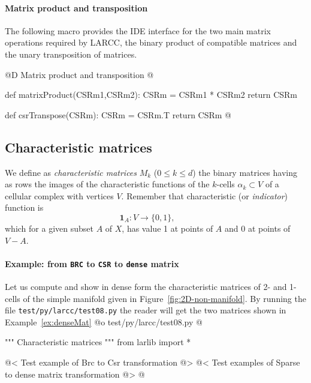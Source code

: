 \documentclass[11pt,oneside]{article}    %
\begin{document}
\paragraph{Matrix product and transposition}

The following macro provides the IDE interface for the two main matrix operations required by LARCC, the binary product of compatible matrices and the unary transposition of matrices.

@D Matrix product and transposition
@{def matrixProduct(CSRm1,CSRm2):
    CSRm = CSRm1 * CSRm2
    return CSRm

def csrTranspose(CSRm):
    CSRm = CSRm.T
    return CSRm
@}


\subsection{Characteristic matrices}

We define as \emph{characteristic matrices} $M_k$ ($0\leq k\leq d$) the binary matrices having as rows the images of the characteristic functions of the $k$-cells $\alpha_k\subset V$ of a cellular complex with vertices $V$.
Remember that characteristic (or \emph{indicator}) function is 
\[
\mathbf{1}_A\colon V \to \{0, 1\}, \qquad 
\]
which for a given subset $A$ of $X$, has value 1 at points of $A$ and 0 at points of $V - A$.
 
\paragraph{Example: from \texttt{BRC} to \texttt{CSR} to \texttt{dense} matrix} 
Let us compute and show in dense form the characteristic matrices of 2- and 1-cells of the simple manifold given in Figure~\ref{fig:2D-non-manifold}.
By running the file \texttt{test/py/larcc/test08.py} the reader will get the two matrices shown in Example~\ref{ex:denseMat}
@o test/py/larcc/test08.py
@{""" Characteristic matrices """
from larlib import *

@< Test example of Brc to Csr transformation @>
@< Test examples of Sparse to dense matrix transformation @>
@}
 
\end{document}
